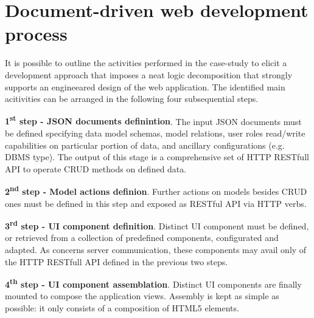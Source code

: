 \section{Document-driven web development process}\label{sec:dev-proc}

It is possible to outline the activities performed in the case-study to elicit a development approach that imposes a neat logic decomposition that strongly supports an engineeared design of the web application. The identified main acitivities can be arranged in the following four subsequential steps.

{\bf 1\textsuperscript{st} step - JSON documents definintion}. The input JSON documents must be defined specifying data model schemas, model relations, user roles read/write capabilities on particular portion of data, and ancillary configurations (e.g. DBMS type). The output of this stage is a comprehensive set of HTTP RESTfull API to operate CRUD methods on defined data.

{\bf 2\textsuperscript{nd} step - Model actions definion}. Further actions on models besides CRUD ones must be defined in this step and exposed as RESTful API via HTTP verbs.

{\bf 3\textsuperscript{rd} step - UI component definition}. Distinct UI component must be defined, or retrieved from a collection of predefined components, configurated and adapted. As concerns server communication, these components may avail only of the HTTP RESTfull API defined in the previous two steps.

{\bf 4\textsuperscript{th} step - UI component assemblation}. Distinct UI components are finally mounted to compose the application views. Assembly is kept as simple as possible: it only consists of a composition of HTML5 elements.




